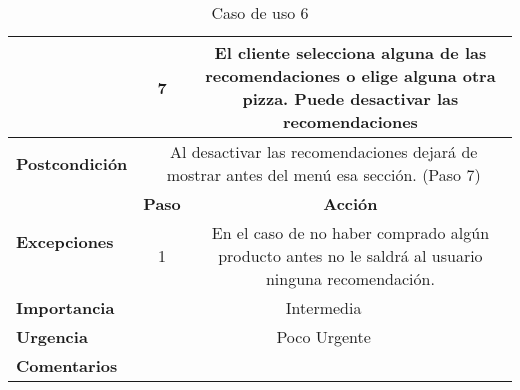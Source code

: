 \documentclass[conference]{IEEEtran}
\begin{document}
\begin{table}[H]
\begin{adjustbox}{width=0.47\textwidth}
\begin{tabular}{|p{11.215em}|c|c|}
\cmidrule{2-3}    \multicolumn{1}{|c|}{} & 7     & \multicolumn{1}{p{32em}|}{El cliente selecciona alguna de las recomendaciones o elige alguna otra pizza. Puede desactivar las recomendaciones} \\
    \midrule
    \textbf{Postcondición} & \multicolumn{2}{p{37.355em}|}{Al desactivar las recomendaciones dejará de mostrar antes del menú esa sección. (Paso 7)} \\
    \midrule
    \multirow{3}[4]{*}{\textbf{Excepciones}} & \multicolumn{1}{p{5.355em}|}{\textbf{Paso}} & \multicolumn{1}{p{32em}|}{\textbf{Acción}} \\
\cmidrule{2-3}    \multicolumn{1}{|c|}{} & \multirow{2}[2]{*}{1} & \multicolumn{1}{c|}{\multirow{2}[2]{*}{En el caso de no haber comprado algún producto antes no le saldrá al usuario ninguna recomendación.}} \\
    \multicolumn{1}{|c|}{} &       &  \\
    \midrule
    \textbf{Importancia} & \multicolumn{2}{p{37.355em}|}{Intermedia} \\
    \midrule
    \textbf{Urgencia} & \multicolumn{2}{p{37.355em}|}{Poco Urgente} \\
    \midrule
    \textbf{Comentarios} & \multicolumn{2}{c|}{} \\
    \bottomrule
    \end{tabular}%
    \end{adjustbox}
    \vspace{0.3cm}
    \caption{Caso de uso 6}
  \label{tab:addlabel}%
\end{table}%
\end{document}

